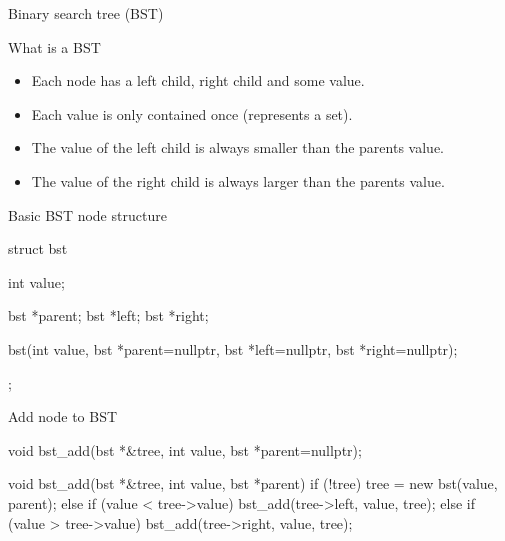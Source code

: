 \documentclass{beamer}
\begin{document}
\begin{frame}
    \begin{center}
        \begin{LARGE}
            Binary search tree (BST)
        \end{LARGE}
    \end{center}
\end{frame}


\begin{frame}{What is a BST}
    \begin{itemize}
        \item Each node has a left child, right child and some value.
        \item Each value is only contained once (represents a set).
        \item The value of the left child is always smaller than the parents value.
        \item The value of the right child is always larger than the parents value. 
    \end{itemize}
\end{frame}


\begin{frame}[fragile]{Basic BST node structure}
\begin{cppcode}
struct bst {
    int value;

    bst *parent;
    bst *left;
    bst *right;

    bst(int value, bst *parent=nullptr, bst *left=nullptr, 
        bst *right=nullptr);
};
\end{cppcode}
\end{frame}


\begin{frame}[fragile]{Add node to BST}
\begin{cppcode}
void bst_add(bst *&tree, int value, bst *parent=nullptr);


void bst_add(bst *&tree, int value, bst *parent) {
    if (!tree)
        tree = new bst(value, parent);
    else if (value < tree->value)
        bst_add(tree->left, value, tree);
    else if (value > tree->value)
        bst_add(tree->right, value, tree);
}
\end{cppcode}
\end{frame}
\end{document}

